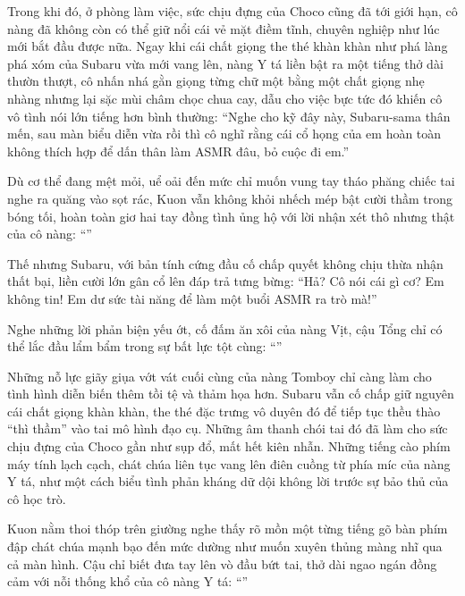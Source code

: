 \documentclass[../main.tex]{subfiles}
\begin{document}
Trong khi đó, ở phòng làm việc, sức chịu đựng của Choco cũng đã tới giới hạn, cô nàng đã không còn có thể giữ nổi cái vẻ mặt điềm tĩnh, chuyên nghiệp như lúc mới bắt đầu được nữa. Ngay khi cái chất giọng the thé khàn khàn như phá làng phá xóm của Subaru vừa mới vang lên, nàng Y tá liền bật ra một tiếng thở dài thườn thượt, cô nhấn nhá gằn giọng từng chữ một bằng một chất giọng nhẹ nhàng nhưng lại sặc mùi châm chọc chua cay, dẫu cho việc bực tức đó khiến cô vô tình nói lớn tiếng hơn bình thường: ``Nghe cho kỹ đây này, Subaru-sama thân mến, sau màn biểu diễn vừa rồi thì cô nghĩ rằng cái cổ họng của em hoàn toàn không thích hợp để dấn thân làm ASMR đâu, bỏ cuộc đi em.''

Dù cơ thể đang mệt mỏi, uể oải đến mức chỉ muốn vung tay tháo phăng chiếc tai nghe ra quăng vào sọt rác, Kuon vẫn không khỏi nhếch mép bật cười thầm trong bóng tối, hoàn toàn giơ hai tay đồng tình ủng hộ với lời nhận xét thô nhưng thật của cô nàng: ``\textit{}''

Thế nhưng Subaru, với bản tính cứng đầu cố chấp quyết không chịu thừa nhận thất bại, liền cười lớn gân cổ lên đáp trả tưng bừng: ``Hả? Cô nói cái gì cơ? Em không tin! Em dư sức tài năng để làm một buổi ASMR ra trò mà!''

Nghe những lời phản biện yếu ớt, cố đấm ăn xôi của nàng Vịt, cậu Tổng chỉ có thể lắc đầu lẩm bẩm trong sự bất lực tột cùng: ``\textit{}''

Những nỗ lực giãy giụa vớt vát cuối cùng của nàng Tomboy chỉ càng làm cho tình hình diễn biến thêm tồi tệ và thảm họa hơn. Subaru vẫn cố chấp giữ nguyên cái chất giọng khàn khàn, the thé đặc trưng vô duyên đó để tiếp tục thều thào ``thì thầm'' vào tai mô hình đạo cụ. Những âm thanh chói tai đó đã làm cho sức chịu đựng của Choco gần như sụp đổ, mất hết kiên nhẫn. Những tiếng cào phím máy tính lạch cạch, chát chúa liên tục vang lên điên cuồng từ phía míc của nàng Y tá, như một cách biểu tình phản kháng dữ dội không lời trước sự bảo thủ của cô học trò.

Kuon nằm thoi thóp trên giường nghe thấy rõ mồn một từng tiếng gõ bàn phím đập chát chúa mạnh bạo đến mức dường như muốn xuyên thủng màng nhĩ qua cả màn hình. Cậu chỉ biết đưa tay lên vò đầu bứt tai, thở dài ngao ngán đồng cảm với nỗi thống khổ của cô nàng Y tá: ``\textit{}''
\end{document}

